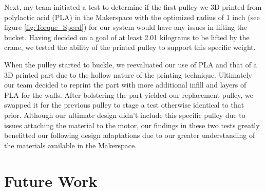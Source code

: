 \documentclass[letterpaper, 12pt]{article}
\begin{document}
Next, my team initiated a test to determine if the first pulley we 3D printed from polylactic acid (PLA) in the Makerspace with the optimized radius of 1 inch (see figure \ref{fig:Torque_Speed}) for our system would have any issues in lifting the bucket. 
Having decided on a goal of at least 2.01 kilograms to be lifted by the crane, we tested the ability of the printed pulley to support this specific weight. 

When the pulley started to buckle, we reevaluated our use of PLA and that of a 3D printed part due to the hollow nature of the printing technique. 
Ultimately our team decided to reprint the part with more additional infill and layers of PLA for the walls. 
After bolstering the part yielded our replacement pulley, we swapped it for the previous pulley to stage a test otherwise identical to that prior. 
Although our ultimate design didn’t include this specific pulley due to issues attaching the material to the motor, our findings in these two tests greatly benefitted our following design adaptations due to our greater understanding of the materials available in the Makerspace.


\section{Future Work}
\end{document}
